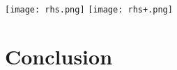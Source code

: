 \begin{center}
\texttt{[image: rhs.png]}
\label{fig:exempleRHS}
\texttt{[image: rhs+.png]}
\label{fig:exempleRHS+}
\end{center}

\section{Conclusion}
\vspace{-1cm}